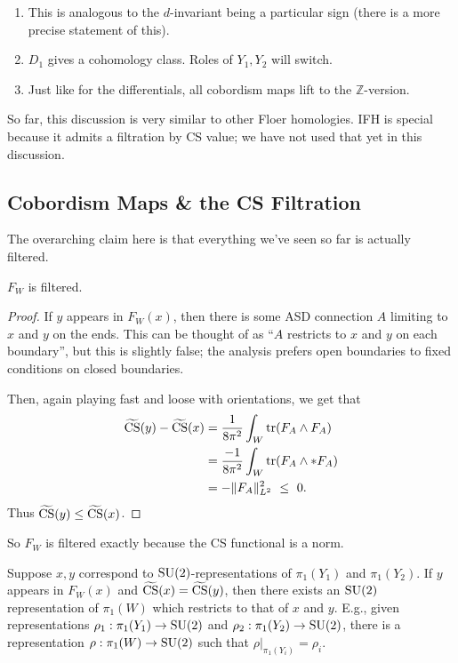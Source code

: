 \documentclass[main]{subfiles}
\begin{document}
\begin{remark}
\begin{enumerate}
\item This is analogous to the $d$-invariant being a particular sign (there is a more precise statement of this).
\item $D_1$ gives a cohomology class. Roles of $Y_1,Y_2$ will switch.
\item Just like for the differentials, all cobordism maps lift to the $\mathbb{Z}$-version.
\end{enumerate}
\end{remark}

So far, this discussion is very similar to other Floer homologies. IFH is special because it admits a filtration by CS value; we have not used that yet in this discussion.

\subsection*{Cobordism Maps \& the CS Filtration}

The overarching claim here is that everything we've seen so far is actually filtered.

\begin{theorem}
$F_W$ is filtered.
\end{theorem}

\begin{proof}
If $y$ appears in $F_W(x)$, then there is some ASD connection $A$ limiting to $x$ and $y$ on the ends. This can be thought of as ``$A$ restricts to $x$ and $y$ on each boundary'', but this is slightly false; the analysis prefers open boundaries to fixed conditions on closed boundaries.

Then, again playing fast and loose with orientations, we get that
\begin{align*}
\widetilde{\operatorname{CS}}(y)-\widetilde{\operatorname{CS}}(x) &= \frac{1}{8\pi^2}\int_W\operatorname{tr}(F_A\wedge F_A)\\
&= \frac{-1}{8\pi^2}\int_W\operatorname{tr}(F_A\wedge\ast F_A)\\
&= -\|F_A\|_{L^2}^2\ \leq\ 0.
\end{align*}
Thus $\widetilde{\operatorname{CS}}(y)\leq\widetilde{\operatorname{CS}}(x)$. \qedhere
\end{proof}

So $F_W$ is filtered exactly because the CS functional is a norm.

\begin{theorem}
Suppose $x,y$ correspond to $\operatorname{SU}(2)$-representations of $\pi_1(Y_1)$ and $\pi_1(Y_2)$. If $y$ appears in $F_W(x)$ and $\widetilde{\operatorname{CS}}(x)=\widetilde{\operatorname{CS}}(y)$, then there exists an $\operatorname{SU}(2)$ representation of $\pi_1(W)$ which restricts to that of $x$ and $y$. E.g., given representations $\rho_1:\pi_1(Y_1)\to\operatorname{SU}(2)$ and $\rho_2:\pi_1(Y_2)\to\operatorname{SU}(2)$, there is a representation $\rho:\pi_1(W)\to\operatorname{SU}(2)$ such that $\rho|_{\pi_1(Y_i)}=\rho_i$.
\end{theorem}
\end{document}
